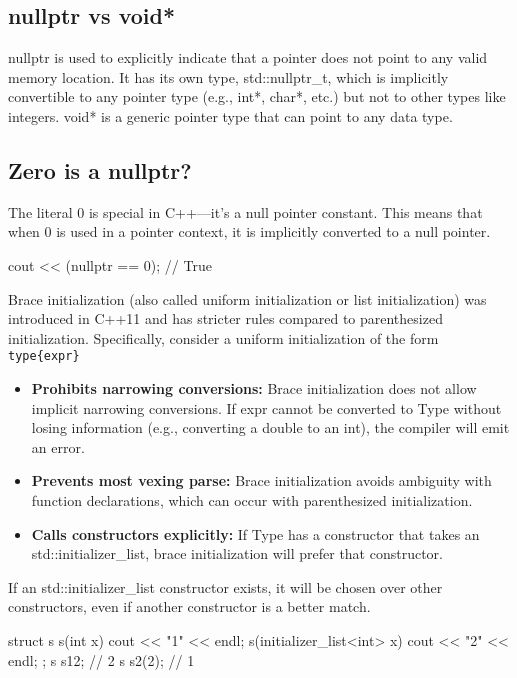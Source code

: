 \documentclass{report}
\begin{document}
    \bigbreak \noindent 
    \subsection{nullptr vs void*}
    \bigbreak \noindent 
    nullptr is used to explicitly indicate that a pointer does not point to any valid memory location.
    \bigbreak \noindent 
    It has its own type, std::nullptr\_t, which is implicitly convertible to any pointer type (e.g., int*, char*, etc.) but not to other types like integers.
    \bigbreak \noindent 
    void* is a generic pointer type that can point to any data type.

    \bigbreak \noindent 
    \subsection{Zero is a nullptr?}
    \bigbreak \noindent 
    The literal 0 is special in C++—it’s a null pointer constant. This means that when 0 is used in a pointer context, it is implicitly converted to a null pointer.
    \bigbreak \noindent 
    \begin{cppcode}
    cout << (nullptr == 0); // True
    \end{cppcode}


    \pagebreak 
    \bigbreak \noindent 
    Brace initialization (also called uniform initialization or list initialization) was introduced in C++11 and has stricter rules compared to parenthesized initialization. Specifically, consider a uniform initialization of the form \texttt{type\{expr\}}
    \begin{itemize}
        \item \textbf{Prohibits narrowing conversions:} Brace initialization does not allow implicit narrowing conversions. If expr cannot be converted to Type without losing information (e.g., converting a double to an int), the compiler will emit an error.
        \item \textbf{Prevents most vexing parse:} Brace initialization avoids ambiguity with function declarations, which can occur with parenthesized initialization.
        \item \textbf{Calls constructors explicitly:} If Type has a constructor that takes an std::initializer\_list, brace initialization will prefer that constructor.
    \end{itemize}
    \bigbreak \noindent 
    If an std::initializer\_list constructor exists, it will be chosen over other constructors, even if another constructor is a better match.
    \bigbreak \noindent 
    \begin{cppcode}
        struct s {
            s(int x) {cout << "1" << endl;}
            s(initializer_list<int> x) {cout << "2" << endl;}
        };
        s s1{2}; // 2
        s s2(2); // 1
    \end{cppcode}
\end{document}
